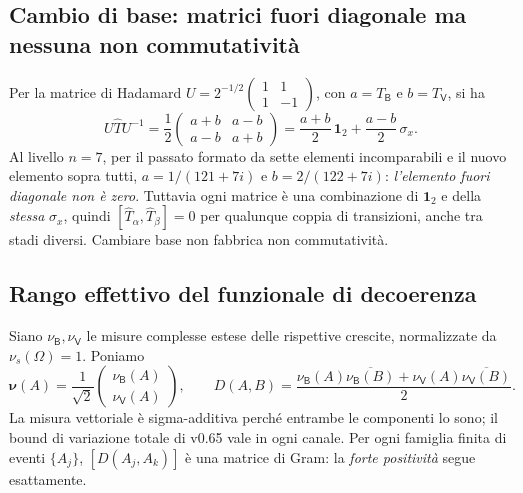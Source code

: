 \documentclass[11pt,a4paper]{article}
\begin{document}
\clearpage
\subsection*{Cambio di base: matrici fuori diagonale ma nessuna non commutativit\`a}
Per la matrice di Hadamard $U=2^{-1/2}\left(\begin{smallmatrix}1&1\\1&-1\end{smallmatrix}\right)$, con $a=T_{\mathsf B}$ e $b=T_{\mathsf V}$, si ha
\begin{equation}
U\widehat T U^{-1}=\frac12\begin{pmatrix}a+b&a-b\\a-b&a+b\end{pmatrix}
=\frac{a+b}{2}\,\mathbf1_2+\frac{a-b}{2}\,\sigma_x.\tag{DS.5}
\end{equation}
Al livello $n=7$, per il passato formato da sette elementi incomparabili e il nuovo elemento sopra tutti, $a=1/(121+7i)$ e $b=2/(122+7i)$: \emph{l'elemento fuori diagonale non \`e zero}. Tuttavia ogni matrice \`e una combinazione di $\mathbf1_2$ e della \emph{stessa} $\sigma_x$, quindi $[\widehat T_\alpha,\widehat T_\beta]=0$ per qualunque coppia di transizioni, anche tra stadi diversi. Cambiare base non fabbrica non commutativit\`a.

\subsection*{Rango effettivo del funzionale di decoerenza}
Siano $\nu_{\mathsf B},\nu_{\mathsf V}$ le misure complesse estese delle rispettive crescite, normalizzate da $\nu_s(\Omega)=1$. Poniamo
\begin{equation}
\mathbf\nu(A)=\frac1{\sqrt2}\begin{pmatrix}\nu_{\mathsf B}(A)\\\nu_{\mathsf V}(A)\end{pmatrix},\qquad
\boxed{D(A,B)=\frac{\nu_{\mathsf B}(A)\overline{\nu_{\mathsf B}(B)}+\nu_{\mathsf V}(A)\overline{\nu_{\mathsf V}(B)}}{2}.}\tag{DS.6}
\end{equation}
La misura vettoriale \`e sigma-additiva perch\'e entrambe le componenti lo sono; il bound di variazione totale di v0.65 vale in ogni canale. Per ogni famiglia finita di eventi $\{A_j\}$, $[D(A_j,A_k)]$ \`e una matrice di Gram: la \emph{forte positivit\`a} segue esattamente.
\end{document}

